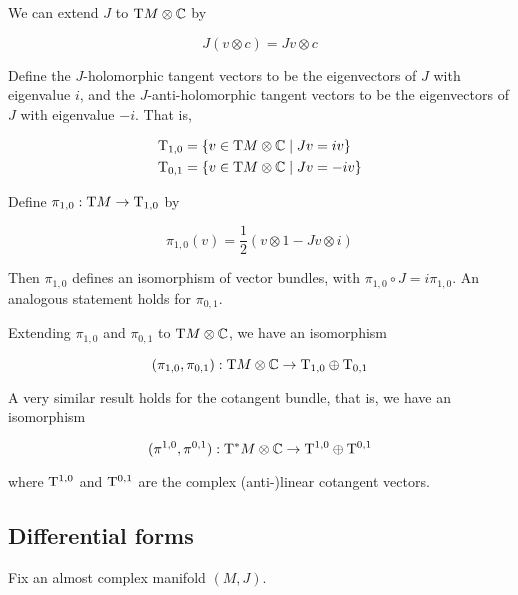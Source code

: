 \begin{proposition}
    We can extend \(J\) to \(\mathrm{T} M \otimes \mathbb{C}\) by

    \[J(v \otimes c) = Jv \otimes c\]
\end{proposition}

\begin{definition}

    Define the \(J\)-holomorphic tangent vectors to be the eigenvectors of \(J\) with eigenvalue \(i\), and the \(J\)-anti-holomorphic tangent vectors to be the eigenvectors of \(J\) with eigenvalue \(-i\). That is,

    \begin{align*}
        \mathrm{T}_{1, 0} &= \{v \in \mathrm{T} M \otimes \mathbb{C} \mid Jv = iv\} \\
       \mathrm{T}_{0, 1} &= \{v \in \mathrm{T} M \otimes \mathbb{C} \mid Jv = -iv\}
    \end{align*}
\end{definition}

\begin{lemma}
    Define \(\pi_{1, 0} : \mathrm{T} M \to \mathrm{T}_{1, 0}\) by

    \[\pi_{1, 0}(v) = \frac{1}{2}(v \otimes 1 - Jv \otimes i)\]

    Then \(\pi_{1, 0}\) defines an isomorphism of vector bundles, with \(\pi_{1, 0}\circ J = i\pi_{1, 0}\). An analogous statement holds for \(\pi_{0, 1}\).
\end{lemma}

\begin{corollary}
    Extending \(\pi_{1, 0}\) and \(\pi_{0, 1}\) to \(\mathrm{T} M \otimes \mathbb{C}\), we have an isomorphism

    \[(\pi_{1, 0}, \pi_{0, 1}) : \mathrm{T} M \otimes \mathbb{C} \to \mathrm{T}_{1, 0} \oplus \mathrm{T}_{0, 1}\]
\end{corollary}

A very similar result holds for the cotangent bundle, that is, we have an isomorphism

\[(\pi^{1, 0}, \pi^{0, 1}) : \mathrm{T}^* M \otimes \mathbb{C} \to \mathrm{T}^{1, 0} \oplus \mathrm{T}^{0, 1}\]

where \(\mathrm{T}^{1, 0}\) and \(\mathrm{T}^{0, 1}\) are the complex (anti-)linear cotangent vectors.

\subsection{Differential forms}

Fix an almost complex manifold \((M, J)\).

